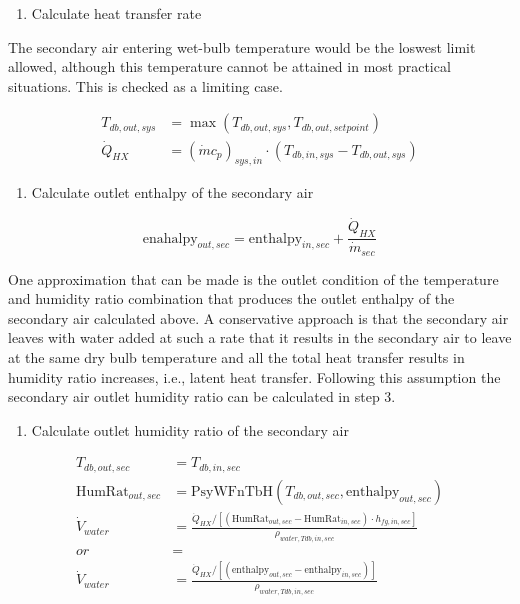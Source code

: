 \begin{enumerate}
\def\labelenumi{\arabic{enumi}.}
\tightlist
\item
  Calculate heat transfer rate
\end{enumerate}

The secondary air entering wet-bulb temperature would be the loswest limit allowed, although this temperature cannot be attained in most practical situations. This is checked as a limiting case.

\begin{equation}
  \begin{array}{rl}
    T_{db,out,sys} & = \max\left(T_{db,out,sys},T_{db,out,setpoint}\right) \\
    \dot{Q}_{HX} & = \left(\dot{m}c_p\right)_{sys,in} \cdot \left(T_{db,in,sys}-T_{db,out,sys}\right)
  \end{array}
\end{equation}

\begin{enumerate}
\def\labelenumi{\arabic{enumi}.}
\setcounter{enumi}{1}
\tightlist
\item
  Calculate outlet enthalpy of the secondary air
\end{enumerate}

\begin{equation}
\text{enahalpy}_{out,sec} = \text{enthalpy}_{in,sec} + \frac{\dot{Q}_{HX}}{\dot{m}_{sec}}
\end{equation}

One approximation that can be made is the outlet condition of the temperature and humidity ratio combination that produces the outlet enthalpy of the secondary air calculated above. A conservative approach is that the secondary air leaves with water added at such a rate that it results in the secondary air to leave at the same dry bulb temperature and all the total heat transfer results in humidity ratio increases, i.e., latent heat transfer. Following this assumption the secondary air outlet humidity ratio can be calculated in step 3.

\begin{enumerate}
\def\labelenumi{\arabic{enumi}.}
\setcounter{enumi}{2}
\tightlist
\item
  Calculate outlet humidity ratio of the secondary air
\end{enumerate}

\begin{equation}
  \begin{array}{rl}
    T_{db,out,sec} & = T_{db,in,sec} \\
    \text{HumRat}_{out,sec} & = \text{PsyWFnTbH}\left(T_{db,out,sec},\text{enthalpy}_{out,sec}\right) \\
    \dot{V}_{water} & = \frac{\dot{Q}_{HX} / \left[ \left(\text{HumRat}_{out,sec}-\text{HumRat}_{in,sec}\right) \cdot h_{fg,in,sec}\right]}{\rho_{water,Tdb,in,sec}} \\
    or & = \\
    \dot{V}_{water} & = \frac{\dot{Q}_{HX} / \left[ \left(\text{enthalpy}_{out,sec}-\text{enthalpy}_{in,sec}\right) \right]}{\rho_{water,Tdb,in,sec}}
  \end{array}
\end{equation}

